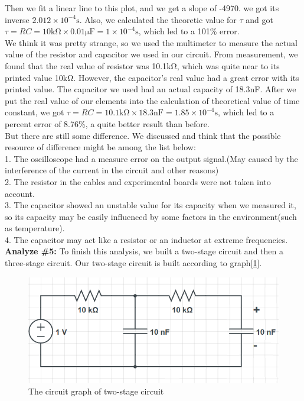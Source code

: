 Then we fit a linear line to this plot, and we get a slope of -4970.
we got its inverse $2.012\times10^{-4}\mathrm{s}$. Also, we calculated the theoretic value for $\tau$ and got 
$\tau = RC = 10\mathrm{k\Omega} \times 0.01\mathrm{\mu F} = 1\times10^{-4}\mathrm{s}$, which led to a 101\% error.\\
\phantom{ } We think it was pretty strange, so we used the multimeter to measure the actual value of the resistor and capacitor we used in our circuit. From measurement, we found that the real value of resistor was 10.1$\mathrm{k\Omega}$, which was quite near to its printed value 10$\mathrm{k\Omega}$. However, the capacitor's real value had a great error with its printed value. The capacitor we used had an actual capacity of 18.3nF. After we put the real value of our elements into the calculation of theoretical value of time constant, we got
$\tau = RC = 10.1\mathrm{k\Omega} \times 18.3 \mathrm{nF} = 1.85\times10^{-4}\mathrm{s}$, which led to a percent error of 8.76\%, a quite better result than before.\\
\phantom{ } But there are still some difference. We discussed and think that the possible resource of difference might be among the list below:\\
1. The oscilloscope had a measure error on the output signal.(May caused by the interference of the current in the circuit and other reasons)\\
2. The resistor in the cables and experimental boards were not taken into account.\\
3. The capacitor showed an unstable value for its capacity when we measured it, so its capacity may be easily influenced by some factors in the environment(such as temperature).\\
4. The capacitor may act like a resistor or an inductor at extreme frequencies.\\
\newline
\textbf{Analyze \#5:} \newline
\phantom{ } To finish this analysis, we built a two-stage circuit and then a three-stage circuit. Our two-stage circuit is built according to graph[\ref{fig:2.3}].\\
\begin{figure}[!htbp]
	\centering %
	\includegraphics[width=\linewidth]{images/2_3.PNG} %
	\caption{The circuit graph of two-stage circuit} %
	\label{fig:2.3} %
\end{figure}
